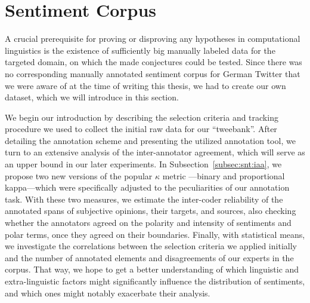 

\chapter{Sentiment Corpus}\label{sec:snt:corpus}

A crucial prerequisite for proving or disproving any hypotheses in
computational linguistics is the existence of sufficiently big manually
labeled data for the targeted domain, on which the made conjectures
could be tested.  Since there was no corresponding manually annotated
sentiment corpus for German Twitter that we were aware of at the time
of writing this thesis, we had to create our own dataset, which we
will introduce in this section.

We begin our introduction by describing the selection criteria and
tracking procedure we used to collect the initial raw data for our
``tweebank''.  After detailing the annotation scheme and presenting
the utilized annotation tool, we turn to an extensive analysis of the
inter-annotator agreement, which will serve as an upper bound in our
later experiments.  In Subsection~\ref{subsec:snt:iaa}, we propose two
new versions of the popular $\kappa$ metric \cite{Cohen:60}---binary
and proportional kappa---which were specifically adjusted to the
peculiarities of our annotation task.  With these two measures, we
estimate the inter-coder reliability of the annotated spans of
subjective opinions, their targets, and sources, also checking whether
the annotators agreed on the polarity and intensity of sentiments and
polar terms, once they agreed on their boundaries.  Finally, with
statistical means, we investigate the correlations between the
selection criteria we applied initially and the number of annotated
elements and disagreements of our experts in the corpus.  That way, we
hope to get a better understanding of which linguistic and
extra-linguistic factors might significantly influence the
distribution of sentiments, and which ones might notably exacerbate
their analysis.

